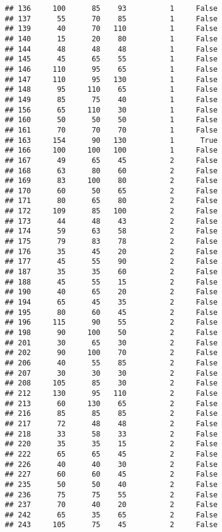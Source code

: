 \documentclass[
]{article}
\begin{document}
\begin{verbatim}
## 136     100      85    93          1     False
## 137      55      70    85          1     False
## 139      40      70   110          1     False
## 140      15      20    80          1     False
## 144      48      48    48          1     False
## 145      45      65    55          1     False
## 146     110      95    65          1     False
## 147     110      95   130          1     False
## 148      95     110    65          1     False
## 149      85      75    40          1     False
## 156      65     110    30          1     False
## 160      50      50    50          1     False
## 161      70      70    70          1     False
## 163     154      90   130          1      True
## 166     100     100   100          1     False
## 167      49      65    45          2     False
## 168      63      80    60          2     False
## 169      83     100    80          2     False
## 170      60      50    65          2     False
## 171      80      65    80          2     False
## 172     109      85   100          2     False
## 173      44      48    43          2     False
## 174      59      63    58          2     False
## 175      79      83    78          2     False
## 176      35      45    20          2     False
## 177      45      55    90          2     False
## 187      35      35    60          2     False
## 188      45      55    15          2     False
## 190      40      65    20          2     False
## 194      65      45    35          2     False
## 195      80      60    45          2     False
## 196     115      90    55          2     False
## 198      90     100    50          2     False
## 201      30      65    30          2     False
## 202      90     100    70          2     False
## 206      40      55    85          2     False
## 207      30      30    30          2     False
## 208     105      85    30          2     False
## 212     130      95   110          2     False
## 213      60     130    65          2     False
## 216      85      85    85          2     False
## 217      72      48    48          2     False
## 218      33      58    33          2     False
## 220      35      35    15          2     False
## 222      65      65    45          2     False
## 226      40      40    30          2     False
## 227      60      60    45          2     False
## 235      50      50    40          2     False
## 236      75      75    55          2     False
## 237      70      40    20          2     False
## 242      65      35    65          2     False
## 243     105      75    45          2     False

\end{verbatim}
\end{document}
